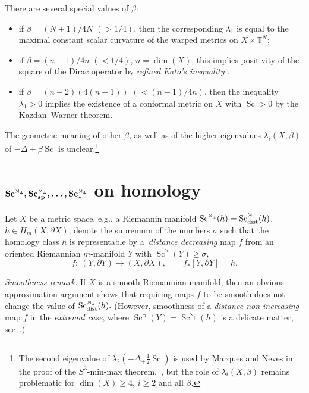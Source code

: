 \documentclass[pdftex]{sigma}
\numberwithin{equation}{section}
\begin{document}
There are several special values of $\beta$:
\begin{itemize}\itemsep=0pt

\item if $\beta=(N+1)/4N$ $(>1/4)$, then the corresponding $\lambda_1$ is equal
to the maximal constant scalar curvature of the warped metrics on $X\times \mathbb T^N$;

\item if $ \beta=(n-1)/4n$ $(<1/4)$, $n=\dim(X)$, this implies positivity of the square of the Dirac operator by {\it refined Kato's inequality} \cite{He2000}.

\item if $\beta=(n-2)(4(n-1))$ $(<(n-1)/4n)$, then the inequality $\lambda_1>0$ implies the existence of a conformal metric on $X$ with $\operatorname{Sc}>0$ by the Kazdan--Warner theorem.
    \end{itemize}

The geometric meaning of other $\beta$, as well
as of the higher eigenvalues $\lambda_i(X,\beta) $ of $-\Delta + \beta \operatorname{Sc}$ is unclear.\footnote{The second eigenvalue of $\lambda_2(-\Delta_ + \frac{1}{2} \operatorname{Sc})$ is used by Marques and Neves in the proof of the $S^3$-min-max theorem,~\cite{MN2011}, but the role of $\lambda_i(X,\beta) $ remains problematic for $\dim(X)\geq 4$,
 $i\geq 2$ and all $\beta$.}

\section[Sc\^{}\{rtimes downarrow\}, Sc\_\{sp\}\^{}\{rtimes downarrow\}, ..., Sc\^{}\{rtimes downarrow\}\_\{ast\} on homology]{$\boldsymbol{\operatorname{Sc}^{\rtimes_\downarrow}, \operatorname{Sc}_{\rm sp}^{\rtimes_\downarrow}, \dots, \operatorname{Sc}^{\rtimes_\downarrow}_\ast}$ on homology}\label{section2}

 Let $X$ be a metric space, e.g., a Riemannin manifold $\operatorname{Sc}^{\rtimes_\downarrow}(h)=\operatorname{Sc}_{\rm dist}^{\rtimes_\downarrow}(h)$, $h\in H_m(X,\partial X)$, denote the supremum of the numbers $\sigma$ such that
the homology class $h$ is representable by
 a~{\it distance decreasing} map $f$ from an oriented Riemannian $m$-manifold $Y$ with $\operatorname{Sc}^\rtimes (Y) \geq \sigma$,
\[
f\colon \ (Y,\partial Y)\to (X, \partial X), \qquad
 f_\ast [Y,\partial Y]=h.
 \]

{\it Smoothness remark.} If $X$ is a smooth Riemannian manifold, then an obvious approximation argument shows that requiring maps $f$ to be smooth does not change the
value of $\operatorname{Sc}_{\rm dist}^{\rtimes_\downarrow}(h).$
(However, smoothness of a {\it distance non-increasing} map $f$ in the {\it extremal case}, where $\operatorname{Sc}^\rtimes (Y) =\operatorname{Sc}^{\rtimes_\downarrow}(h)$ is a delicate matter, see~\cite{CHS2023}.)
\end{document}
